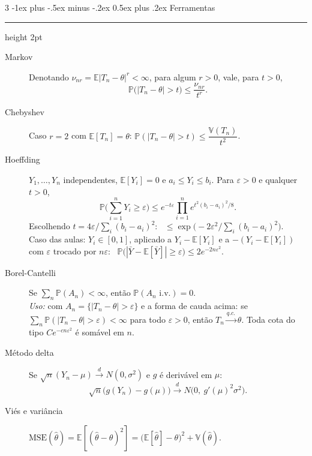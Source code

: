 \documentclass[10pt,landscape]{article}
\makeatletter
\newcommand{\E}{\mathbb{E}}
\newcommand{\V}{\mathbb{V}}
\renewcommand{\P}{\mathbb{P}}
\newcommand{\MSE}{\textrm{MSE}}
\newcommand{\qc}{\xrightarrow{q.c.}}
\newcommand{\dto}{\xrightarrow{d}}
\renewcommand{\section}{\@startsection{section}{1}{0mm}%
                                {-1ex plus -.5ex minus -.2ex}%
                                {0.5ex plus .2ex}%
                                {\normalfont\small\bfseries}}
\newcommand{\secrule}{\smallskip \hrule height 2pt \smallskip}
\makeatother
\begin{document}
\begin{multicols}{3}
\section{Ferramentas}\secrule
\begin{description}
  \item[Markov] Denotando $\nu_{nr}=\E|T_n-\theta|^r<\infty$, para algum $r>0$, vale, para $t>0$,
  \[\P\big(|T_n-\theta|>t\big)\le\frac{\nu_{nr}}{t^r}.\]
  \item[Chebyshev] Caso $r=2$ com $\E[T_n]=\theta$: \quad $\P(|T_n-\theta|>t)\le \dfrac{\V(T_n)}{t^2}$.
  \item[Hoeffding] $Y_1,\dots,Y_n$ independentes, $\E[Y_i]=0$ e $a_i\le Y_i\le b_i$. Para $\varepsilon>0$ e qualquer $t>0$,
  \[\P\Big(\sum_{i=1}^nY_i\ge\varepsilon\Big)\le e^{-t\varepsilon}\prod_{i=1}^ne^{t^2(b_i-a_i)^2/8}.\]
  Escolhendo $t=4\varepsilon/\sum_i(b_i-a_i)^2$: \ $\le\exp\!\big(-2\varepsilon^2/\sum_i(b_i-a_i)^2\big)$. \\
  Caso das aulas: $Y_i\in[0,1]$, aplicado a $Y_i-\E[Y_i]$ e a $-(Y_i-\E[Y_i])$ com $\varepsilon$ trocado por $n\varepsilon$:
  \ $\P\big(|\bar Y-\E[\bar Y]|\ge\varepsilon\big)\le2e^{-2n\varepsilon^2}$.
  \item[Borel-Cantelli] Se $\sum_n\P(A_n)<\infty$, então $\P(A_n\text{ i.v.})=0$. \\
  \emph{Uso:} com $A_n=\{|T_n-\theta|>\varepsilon\}$ e a forma de cauda acima: se $\sum_n\P(|T_n-\theta|>\varepsilon)<\infty$ para todo $\varepsilon>0$, então $T_n\qc\theta$. Toda cota do tipo $Ce^{-cn\varepsilon^2}$ é somável em $n$.
  \item[Método delta] Se $\sqrt n(Y_n-\mu)\dto N(0,\sigma^2)$ e $g$ é derivável em $\mu$:
  \[\sqrt n\big(g(Y_n)-g(\mu)\big)\dto N\big(0,\ g'(\mu)^2\sigma^2\big).\]
  \item[Viés e variância] $\MSE(\hat\theta)=\E[(\hat\theta-\theta)^2]=\big(\E[\hat\theta]-\theta\big)^2+\V(\hat\theta)$.
\end{description}


\end{multicols}
\end{document}

